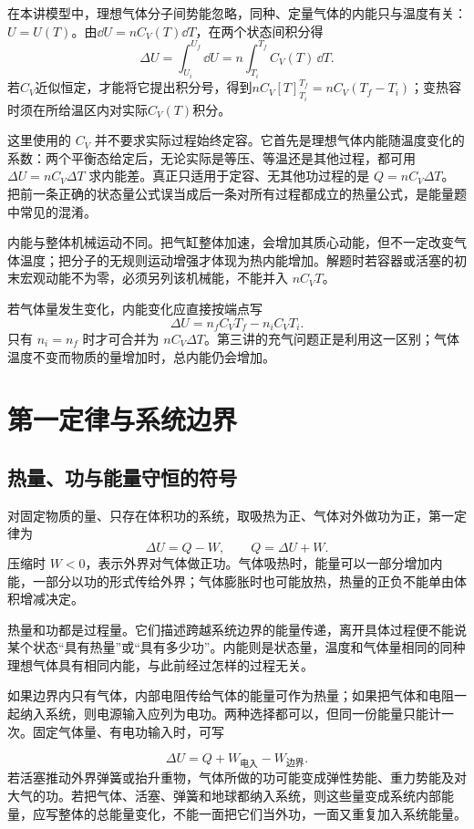在本讲模型中，理想气体分子间势能忽略，同种、定量气体的内能只与温度有关：$U=U(T)$。由$\dd U=nC_V(T)\dd T$，在两个状态间积分得
\[
\Delta U=\int_{U_i}^{U_f}\dd U
=n\int_{T_i}^{T_f}C_V(T)\,\dd T.
\]
若$C_V$近似恒定，才能将它提出积分号，得到$nC_V[T]_{T_i}^{T_f}=nC_V(T_f-T_i)$；变热容时须在所给温区内对实际$C_V(T)$积分。

这里使用的 $C_V$ 并不要求实际过程始终定容。它首先是理想气体内能随温度变化的系数：两个平衡态给定后，无论实际是等压、等温还是其他过程，都可用 $\Delta U=nC_V\Delta T$ 求内能差。真正只适用于定容、无其他功过程的是 $Q=nC_V\Delta T$。把前一条正确的状态量公式误当成后一条对所有过程都成立的热量公式，是能量题中常见的混淆。

内能与整体机械运动不同。把气缸整体加速，会增加其质心动能，但不一定改变气体温度；把分子的无规则运动增强才体现为热内能增加。解题时若容器或活塞的初末宏观动能不为零，必须另列该机械能，不能并入 $nC_VT$。

若气体量发生变化，内能变化应直接按端点写
\[\Delta U=n_fC_VT_f-n_iC_VT_i.\]
只有 $n_i=n_f$ 时才可合并为 $nC_V\Delta T$。第三讲的充气问题正是利用这一区别；气体温度不变而物质的量增加时，总内能仍会增加。

\section{第一定律与系统边界}
\subsection{热量、功与能量守恒的符号}
对固定物质的量、只存在体积功的系统，取吸热为正、气体对外做功为正，第一定律为
\[\boxed{\Delta U=Q-W},\qquad Q=\Delta U+W.\]
压缩时 $W<0$，表示外界对气体做正功。气体吸热时，能量可以一部分增加内能，一部分以功的形式传给外界；气体膨胀时也可能放热，热量的正负不能单由体积增减决定。

热量和功都是过程量。它们描述跨越系统边界的能量传递，离开具体过程便不能说某个状态“具有热量”或“具有多少功”。内能则是状态量，温度和气体量相同的同种理想气体具有相同内能，与此前经过怎样的过程无关。


如果边界内只有气体，内部电阻传给气体的能量可作为热量；如果把气体和电阻一起纳入系统，则电源输入应列为电功。两种选择都可以，但同一份能量只能计一次。固定气体量、有电功输入时，可写

\[\Delta U=Q+W_{\text{电入}}-W_{\text{边界}}.
\]
若活塞推动外界弹簧或抬升重物，气体所做的功可能变成弹性势能、重力势能及对大气的功。若把气体、活塞、弹簧和地球都纳入系统，则这些量变成系统内部能量，应写整体的总能量变化，不能一面把它们当外功，一面又重复加入系统能量。

